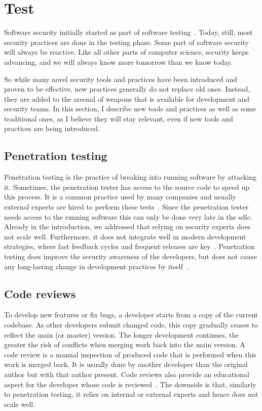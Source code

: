 \section{Test}
\label{sec:related-test}

Software security initially started as part of software testing~\cite{sharma2017}.
Today, still, most security practices are done in the testing phase.
Some part of software security will always be reactive.
Like all other parts of computer science, security keeps advancing, and we will always know more tomorrow than we know today.

So while many novel security tools and practices have been introduced and proven to be effective, new practices generally do not replace old ones.
Instead, they are added to the arsenal of weapons that is available for development and security teams.
In this section, I describe new tools and practices as well as some traditional ones, as I believe they will stay relevant, even if new tools and practices are being introduced.

\subsection{Penetration testing}
Penetration testing is the practice of breaking into running software by attacking it.
Sometimes, the penetration tester has access to the source code to speed up this process.
It is a common practice used by many companies and usually external experts are hired to perform these tests~\cite{cruzes2017security,bsimm11}.
Since the penetration tester needs access to the running software this can only be done very late in the \gls{sdlc}.
Already in the introduction, we addressed that relying on security experts does not scale well.
Furthermore, it does not integrate well in modern development strategies, where fast feedback cycles and frequent releases are key~\cite{securitytestingagile}.
Penetration testing does improve the security awareness of the developers, but does not cause any long-lasting change in development practices by itself~\cite{turpe2016penetration}.

\subsection{Code reviews}
To develop new features or fix bugs, a developer starts from a copy of the current codebase.
As other developers submit changed code, this copy gradually ceases to reflect the main (or master) version.
The longer development continues, the greater the risk of conflicts when merging work back into the main version.
A code review is a manual inspection of produced code that is performed when this work is merged back.
It is usually done by another developer than the original author but with that author present.
Code reviews also provide an educational aspect for the developer whose code is reviewed~\cite{futcher2008guidelines}.
The downside is that, similarly to penetration testing, it relies on internal or external experts and hence does not scale well.

